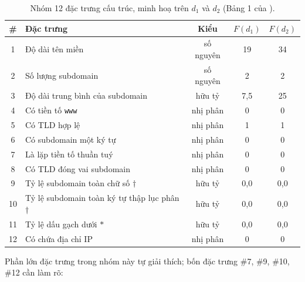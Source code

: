 \begin{table}[H]
\centering
\caption{Nhóm 12 đặc trưng cấu trúc, minh hoạ trên $d_1$ và $d_2$ (Bảng 1 của \cite{schuppen2018fanci}).}
\label{tab:cau-truc}
\begin{tabularx}{\textwidth}{|c|>{\raggedright\arraybackslash}X|c|c|c|}
\hline
\rowcolor{LightCyan}
\textbf{\#} & \textbf{Đặc trưng} & \textbf{Kiểu} & \textbf{$F(d_1)$} & \textbf{$F(d_2)$} \\
\hline
1  & Độ dài tên miền                                  & số nguyên & 19  & 34 \\ \hline
2  & Số lượng subdomain                               & số nguyên & 2   & 2  \\ \hline
3  & Độ dài trung bình của subdomain                  & hữu tỷ    & 7,5 & 25 \\ \hline
4  & Có tiền tố \texttt{www}                          & nhị phân  & 0   & 0  \\ \hline
5  & Có TLD hợp lệ                                    & nhị phân  & 1   & 1  \\ \hline
6  & Có subdomain một ký tự                           & nhị phân  & 0   & 0  \\ \hline
7  & Là lặp tiền tố thuần tuý                          & nhị phân  & 0   & 0  \\ \hline
8  & Có TLD đóng vai subdomain                         & nhị phân  & 0   & 0  \\ \hline
9  & Tỷ lệ subdomain toàn chữ số $\dagger$             & hữu tỷ    & 0,0 & 0,0 \\ \hline
10 & Tỷ lệ subdomain toàn ký tự thập lục phân $\dagger$ & hữu tỷ   & 0,0 & 0,0 \\ \hline
11 & Tỷ lệ dấu gạch dưới $*$                           & hữu tỷ    & 0,0 & 0,0 \\ \hline
12 & Có chứa địa chỉ IP                               & nhị phân  & 0   & 0  \\ \hline
\end{tabularx}
\end{table}

Phần lớn đặc trưng trong nhóm này tự giải thích; bốn đặc trưng \#7, \#9, \#10, \#12 cần làm rõ:

